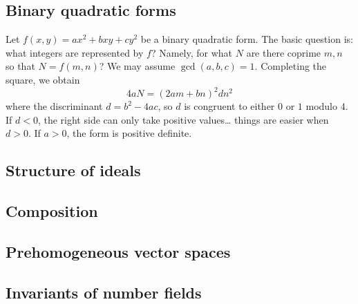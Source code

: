 \subsection{Binary quadratic forms}

Let $f(x,y)=a x^2 + b x y + c y^2$ be a binary quadratic form. The basic 
question is: what integers are represented by $f$? Namely, for what $N$ are 
there coprime $m,n$ so that $N=f(m,n)$? We may assume $\gcd(a,b,c)=1$. 
Completing the square, we obtain 
\[
  4 a N = (2 a m+b n)^2  d n^2
\]
where the discriminant $d=b^2 -4 a c$, so $d$ is congruent to either $0$ or 
$1$ modulo $4$. If $d<0$, the right side can only take positive values\ldots 
things are easier when $d>0$. If $a>0$, the form is positive definite. 





\subsection{Structure of ideals}

\subsection{Composition}

\subsection{Prehomogeneous vector spaces}

\subsection{Invariants of number fields}



